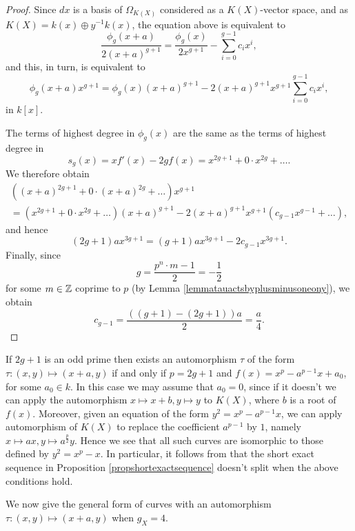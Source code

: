 \begin{proof}
    Since $dx$ is a basis of $\Omega_{K(X)}$ considered as a $K(X)$-vector space, and as $K(X) = k(x) \oplus y^{-1}k(x)$, the equation above is equivalent to
        \[
        \frac{\phi_g(x+a)}{2(x+a)^{g+1}} = \frac{\phi_g(x)}{2x^{g+1}} - \sum_{i=0}^{g-1} c_i x^i,
        \]
    and this, in turn, is equivalent to
        \[
        \phi_g(x+a)x^{g+1} = \phi_g(x)(x+a)^{g+1} - 2(x+a)^{g+1}x^{g+1}\sum_{i=0}^{g-1}c_i x^i,
        \]
    in $k[x]$.

    The terms of highest degree in $\phi_g(x)$ are the same as the terms of highest degree in 
        \[
        s_g(x) = xf'(x) - 2gf(x) = x^{2g+1} + 0\cdot x^{2g} + \ldots.
        \]
    We therefore obtain
        \begin{multline*}
        \left( (x+a)^{2g+1} + 0 \cdot (x+a)^{2g} + \ldots \right) x^{g+1}  \\ = (x^{2g+1} + 0 \cdot x^{2g} + \ldots )(x+a)^{g+1} - 2(x+a)^{g+1}x^{g+1}(c_{g-1}x^{g-1} + \ldots ),
        \end{multline*}
    and hence
        \[
        (2g+1)ax^{3g+1} = (g+1)ax^{3g+1} - 2c_{g-1}x^{3g+1}.
        \]
    Finally, since
        \[
        g = \frac{p^n\cdot m -1}{2} = -\frac{1}{2}
        \]
    for some $m\in {\mathbb Z}$ coprime to $p$ (by Lemma \ref{lemmatauactsbyplusminusoneony}), we obtain
        \[
        c_{g-1} = \frac{((g+1) - (2g+1))a}{2} = \frac{a}{4}.
        \]  
    \end{proof}

    \begin{ex}
    If $2g+1$ is an odd prime then exists an automorphism $\tau$ of the form $\tau\colon (x,y) \mapsto (x+a,y)$ if and only if $p=2g+1$ and $f(x) = x^p - a^{p-1}x + a_0$, for some $a_0 \in k$.
    In this case we may assume that $a_0 = 0$, since if it doesn't we can apply the automorphism $x \mapsto x+b, y\mapsto y$ to $K(X)$, where $b$ is a root of $f(x)$.
    Moreover, given an equation of the form $y^2 = x^p - a^{p-1}x$, we can apply automorphism of $K(X)$ to replace the coefficient $a^{p-1}$ by $1$, namely $x \mapsto ax, y \mapsto a^{\frac{p}{2}}y$.
    Hence we see that all such curves are isomorphic to those defined by $y^2 = x^p - x$.
    In particular, it follows from \cite[Thm.\ 3.1]{canonicalrepresentation} that the short exact sequence in Proposition \ref{propshortexactsequence} doesn't split when the above conditions hold.
    \end{ex}

We now give the general form of curves with an automorphism $\tau \colon (x,y) \mapsto (x+a, y)$ when $g_X = 4$.


